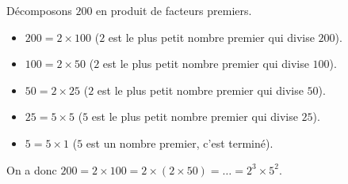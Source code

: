 	\begin{tip}[Exemple]
		Décomposons $200$ en produit de facteurs premiers.
		\begin{itemize}
			\item $200 = 2 \times 100$ ($2$ est le plus petit nombre premier qui divise $200$).
			\item $100 = 2 \times 50$ ($2$ est le plus petit nombre premier qui divise $100$).
			\item $50 = 2 \times 25$ ($2$ est le plus petit nombre premier qui divise $50$).
			\item $25 = 5 \times 5$ ($5$ est le plus petit nombre premier qui divise $25$).
			\item $5 = 5 \times 1$ ($5$ est un nombre premier, c'est terminé).
		\end{itemize}
		On a donc $200 = 2 \times 100 = 2 \times (2 \times 50) = \dots = 2^3 \times 5^2$.
	\end{tip}
